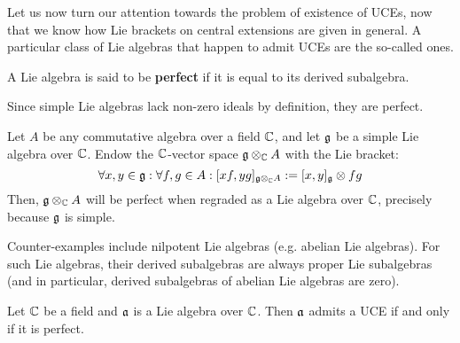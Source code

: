         Let us now turn our attention towards the problem of existence of UCEs, now that we know how Lie brackets on central extensions are given in general. A particular class of Lie algebras that happen to admit UCEs are the so-called  ones.
        \begin{definition}
            A Lie algebra is said to be \textbf{perfect} if it is equal to its derived subalgebra. 
        \end{definition}
        \begin{example}
            Since simple Lie algebras lack non-zero ideals by definition, they are perfect. 
        \end{example}
        \begin{example}
            Let $A$ be any commutative algebra over a field $\mathbb{C}$, and let $\mathfrak{g}$ be a simple Lie algebra over $\mathbb{C}$. Endow the $\mathbb{C}$-vector space $\g \tensor_{\bbC} A$ with the Lie bracket:
                $$\forall x, y \in \g: \forall f, g \in A: [x f, y g]_{\g \tensor_{\bbC} A} := [x, y]_{\g} \tensor fg$$
            Then, $\g \tensor_{\bbC} A$ will be perfect when regraded as a Lie algebra over $\mathbb{C}$, precisely because $\mathfrak{g}$ is simple.
        \end{example}
        \begin{example}
            Counter-examples include nilpotent Lie algebras (e.g. abelian Lie algebras). For such Lie algebras, their derived subalgebras are always proper Lie subalgebras (and in particular, derived subalgebras of abelian Lie algebras are zero). 
        \end{example}
        \begin{proposition} \label{prop: perfect_lie_algebras_admit_UCEs}
            \cite[Lemma 1.10]{garland_arithmetics_of_loop_groups} Let $\mathbb{C}$ be a field and $\mathfrak{a}$ is a Lie algebra over $\mathbb{C}$. Then $\mathfrak{a}$ admits a UCE if and only if it is perfect.
        \end{proposition}

